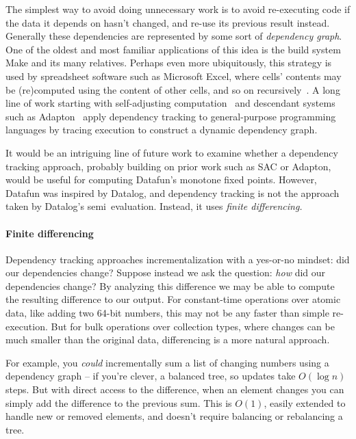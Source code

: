 The simplest way to avoid doing unnecessary work is to avoid re-executing code
if the data it depends on hasn't changed, and re-use its previous result
instead.
%
Generally these dependencies are represented by some sort of \emph{dependency
  graph}.
%
One of the oldest and most familiar applications of this idea is the build
system Make and its many relatives.
%
Perhaps even more ubiquitously, this strategy is used by spreadsheet software such as Microsoft Excel, where cells' contents may be (re)computed using the content of other cells, and so on recursively~\citep{build-systems-a-la-carte}.
%
A long line of work starting with self-adjusting
computation~\citep{DBLP:conf/popl/AcarBH02,umut-acar-thesis} and descendant
systems such as Adapton~\citep{DBLP:conf/pldi/HammerKHF14} apply dependency
tracking to general-purpose programming languages by tracing execution to
construct a dynamic dependency graph.

It would be an intriguing line of future work to examine whether a dependency
tracking approach, probably building on prior work such as SAC or Adapton, would
be useful for computing Datafun's monotone fixed points. However, Datafun was
inspired by Datalog, and dependency tracking is not the approach taken by
Datalog's semi\naive\ evaluation. Instead, it uses \emph{finite differencing.}

\paragraph{Finite differencing}

Dependency tracking approaches incrementalization with a yes-or-no mindset: did
our dependencies change?
%
%
Suppose instead we ask the question: \emph{how} did our dependencies change?
%
By analyzing this difference we may be able to compute the resulting difference
to our output.
%
%
For constant-time operations over atomic data, like adding two 64-bit numbers,
this may not be any faster than simple re-execution.
%
But for bulk operations over collection types, where changes can be much smaller
than the original data, differencing is a more natural approach.

For example, you \emph{could} incrementally sum a list of changing numbers using
a dependency graph -- if you're clever, a balanced tree, so updates take $O(\log
n)$ steps.
%
But with direct access to the difference, when an element changes you can simply
add the difference to the previous sum. This is $O(1)$, easily extended to
handle new or removed elements, and doesn't require balancing or rebalancing a
tree.

